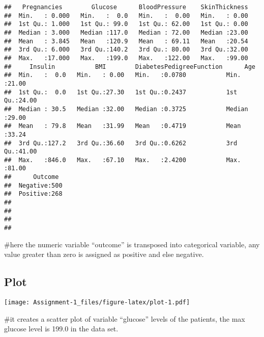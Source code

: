 \documentclass[
]{article}
\newenvironment{Shaded}{\begin{snugshade}}{\end{snugshade}}
\newcommand{\AttributeTok}[1]{\textcolor[rgb]{0.13,0.29,0.53}{#1}}
\newcommand{\DecValTok}[1]{\textcolor[rgb]{0.00,0.00,0.81}{#1}}
\newcommand{\FunctionTok}[1]{\textcolor[rgb]{0.13,0.29,0.53}{\textbf{#1}}}
\newcommand{\NormalTok}[1]{#1}
\newcommand{\OtherTok}[1]{\textcolor[rgb]{0.56,0.35,0.01}{#1}}
\newcommand{\SpecialCharTok}[1]{\textcolor[rgb]{0.81,0.36,0.00}{\textbf{#1}}}
\newcommand{\StringTok}[1]{\textcolor[rgb]{0.31,0.60,0.02}{#1}}
\begin{document}
\begin{Shaded}
\end{Shaded}

\begin{verbatim}
##   Pregnancies        Glucose      BloodPressure    SkinThickness  
##  Min.   : 0.000   Min.   :  0.0   Min.   :  0.00   Min.   : 0.00  
##  1st Qu.: 1.000   1st Qu.: 99.0   1st Qu.: 62.00   1st Qu.: 0.00  
##  Median : 3.000   Median :117.0   Median : 72.00   Median :23.00  
##  Mean   : 3.845   Mean   :120.9   Mean   : 69.11   Mean   :20.54  
##  3rd Qu.: 6.000   3rd Qu.:140.2   3rd Qu.: 80.00   3rd Qu.:32.00  
##  Max.   :17.000   Max.   :199.0   Max.   :122.00   Max.   :99.00  
##     Insulin           BMI        DiabetesPedigreeFunction      Age       
##  Min.   :  0.0   Min.   : 0.00   Min.   :0.0780           Min.   :21.00  
##  1st Qu.:  0.0   1st Qu.:27.30   1st Qu.:0.2437           1st Qu.:24.00  
##  Median : 30.5   Median :32.00   Median :0.3725           Median :29.00  
##  Mean   : 79.8   Mean   :31.99   Mean   :0.4719           Mean   :33.24  
##  3rd Qu.:127.2   3rd Qu.:36.60   3rd Qu.:0.6262           3rd Qu.:41.00  
##  Max.   :846.0   Max.   :67.10   Max.   :2.4200           Max.   :81.00  
##      Outcome   
##  Negative:500  
##  Positive:268  
##                
##                
##                
## 
\end{verbatim}

\#here the numeric variable ``outcome'' is transposed into categorical
variable, any value greater than zero is assigned as positive and else
negative.

\hypertarget{plot}{%
\subsection{Plot}\label{plot}}

\begin{Shaded}
\end{Shaded}

\texttt{[image: Assignment-1\_files/figure-latex/plot-1.pdf]}

\#it creates a scatter plot of variable ``glucose'' levels of the
patients, the max glucose level is 199.0 in the data set.
\end{document}
